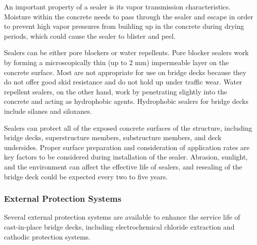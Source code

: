 An important property of a sealer is its vapor transmission characteristics. Moisture within the concrete needs to pass through the sealer and escape in order to prevent high vapor pressures from building up in the concrete during drying periods, which could cause the sealer to blister and peel.

Sealers can be either pore blockers or water repellents. Pore blocker sealers work by forming a microscopically thin (up to 2 mm) impermeable layer on the concrete surface. Most are not appropriate for use on bridge decks because they do not offer good skid resistance and do not hold up under traffic wear. Water repellent sealers, on the other hand, work by penetrating slightly into the concrete and acting as hydrophobic agents. Hydrophobic sealers for bridge decks include silanes and siloxanes.

Sealers can protect all of the exposed concrete surfaces of the structure, including bridge decks, superstructure members, substructure members, and deck undersides. Proper surface preparation and consideration of application rates are key factors to be considered during installation of the sealer. Abrasion, sunlight, and the environment can affect the effective life of sealers, and resealing of the bridge deck could be expected every two to five years.


\subsubsection{External Protection Systems}
Several external protection systems are available to enhance the service life of cast-in-place bridge decks, including electrochemical chloride extraction and cathodic protection systems.

